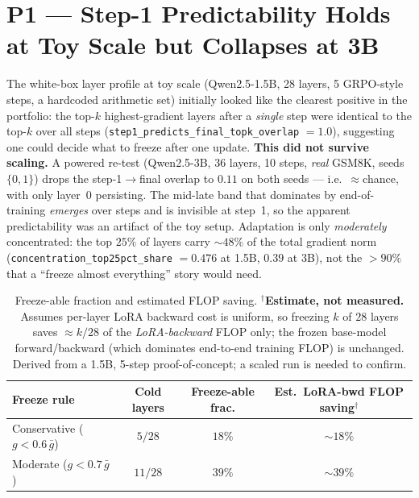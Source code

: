 \documentclass[12pt,a4paper]{report}
\begin{document}
\section{P1 --- Step-1 Predictability Holds at Toy Scale but Collapses at 3B}
\label{sec:p1}

The white-box layer profile at toy scale (Qwen2.5-1.5B, 28 layers, 5 GRPO-style
steps, a hardcoded arithmetic set) initially looked like the clearest positive in
the portfolio: the top-$k$ highest-gradient layers after a \emph{single} step were
identical to the top-$k$ over all steps
(\texttt{step1\_predicts\_final\_topk\_overlap} $=1.0$), suggesting one could decide
what to freeze after one update. \textbf{This did not survive scaling.} A powered
re-test (Qwen2.5-3B, 36 layers, 10 steps, \emph{real} GSM8K, seeds $\{0,1\}$) drops
the step-1$\to$final overlap to $0.11$ on both seeds --- i.e.\ ${\approx}$chance, with
only layer~0 persisting. The mid-late band that dominates by end-of-training
\emph{emerges} over steps and is invisible at step~1, so the apparent predictability
was an artifact of the toy setup. Adaptation is only \emph{moderately} concentrated:
the top $25\%$ of layers carry ${\sim}48\%$ of the total gradient norm
(\texttt{concentration\_top25pct\_share} $=0.476$ at 1.5B, $0.39$ at 3B), not the
$>90\%$ that a ``freeze almost everything'' story would need.

\begin{table}[h]
\centering
\small
\begin{tabular}{lccc}
\toprule
Freeze rule & Cold layers & Freeze-able frac. & Est.\ LoRA-bwd FLOP saving$^{\dagger}$ \\
\midrule
Conservative ($g<0.6\,\bar{g}$) & $5/28$  & $18\%$ & $\sim\!18\%$ \\
Moderate ($g<0.7\,\bar{g}$)     & $11/28$ & $39\%$ & $\sim\!39\%$ \\
\bottomrule
\end{tabular}
\caption{Freeze-able fraction and estimated FLOP saving. $^{\dagger}$\textbf{Estimate,
not measured.} Assumes per-layer LoRA backward cost is uniform, so freezing $k$ of
$28$ layers saves $\approx k/28$ of the \emph{LoRA-backward} FLOP only; the frozen
base-model forward/backward (which dominates end-to-end training FLOP) is unchanged.
Derived from a 1.5B, 5-step proof-of-concept; a scaled run is needed to confirm.}
\label{tab:p1-freeze-estimate}
\end{table}
\end{document}
